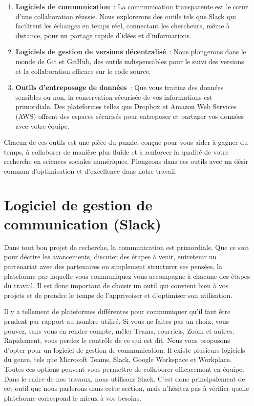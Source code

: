 \documentclass[
  letterpaper,
]{scrbook}
\begin{document}
\begin{enumerate}
\def\labelenumi{\arabic{enumi}.}
\item
  \textbf{Logiciels de communication}~: La communication transparente
  est le cœur d'une collaboration réussie. Nous explorerons des outils
  tels que Slack qui facilitent les échanges en temps réel, connectant
  les chercheurs, même à distance, pour un partage rapide d'idées et
  d'informations.
\item
  \textbf{Logiciels de gestion de versions décentralisé}~: Nous
  plongerons dans le monde de Git et GitHub, des outils indispensables
  pour le suivi des versions et la collaboration efficace sur le code
  source.
\item
  \textbf{Outils d'entreposage de données}~: Que vous traitiez des
  données sensibles ou non, la conservation sécurisée de vos
  informations est primordiale. Des plateformes telles que Dropbox et
  Amazon Web Services (AWS) offrent des espaces sécurisés pour
  entreposer et partager vos données avec votre équipe.
\end{enumerate}

Chacun de ces outils est une pièce du puzzle, conçue pour vous aider à
gagner du temps, à collaborer de manière plus fluide et à renforcer la
qualité de votre recherche en sciences sociales numériques. Plongeons
dans ces outils avec un désir commun d'optimisation et d'excellence dans
notre travail.

\hypertarget{logiciel-de-gestion-de-communication-slack}{%
\section{Logiciel de gestion de communication
(Slack)}\label{logiciel-de-gestion-de-communication-slack}}

Dans tout bon projet de recherche, la communication est primordiale. Que
ce soit pour décrire les avancements, discuter des étapes à venir,
entretenir un partenariat avec des partenaires ou simplement structurer
ses pensées, la plateforme par laquelle vous communiquez vous accompagne
à chacune des étapes du travail. Il est donc important de choisir un
outil qui convient bien à vos projets et de prendre le temps de
l'apprivoiser et d'optimiser son utilisation.

Il y a tellement de plateformes différentes pour communiquer qu'il faut
être prudent par rapport au nombre utilisé. Si vous ne faites pas un
choix, vous pouvez, sans vous en rendre compte, mêler Teams, courriels,
Zoom et autres. Rapidement, vous perdez le contrôle de ce qui est dit.
Nous vous proposons d'opter pour un logiciel de gestion de
communication. Il existe plusieurs logiciels du genre, tels que
Microsoft Teams, Slack, Google Workspace et Workplace. Toutes ces
options peuvent vous permettre de collaborer efficacement en équipe.
Dans le cadre de nos travaux, nous utilisons Slack. C'est donc
principalement de cet outil que nous parlerons dans cette section, mais
n'hésitez pas à vérifier quelle plateforme correspond le mieux à vos
besoins.
\end{document}
